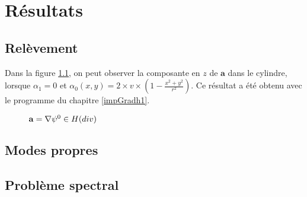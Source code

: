 \chapter{Résultats}

\section{Relèvement}
\label{respsih1}

Dans la figure \ref{az}, on peut observer la composante en $z$ de $\mathbf{a}$ dans le cylindre, lorsque $\alpha_1=0$ et $\alpha_0(x,y)=2\times v\times\left(1-\frac{x^2+y^2}{r^2}\right)$. Ce résultat a été obtenu avec le programme du chapitre \ref{impGradh1}. 

\begin{figure}[H]
\makebox[\textwidth][c]{
  \subfloat{\texttt{[image: az]}}\ 
  \subfloat{\texttt{[image: az1]}}
}
\caption{$\mathbf{a}={\nabla}\psi^0\in H(div)$}
\label{az}
\end{figure}

\section{Modes propres}

\section{Problème spectral}


